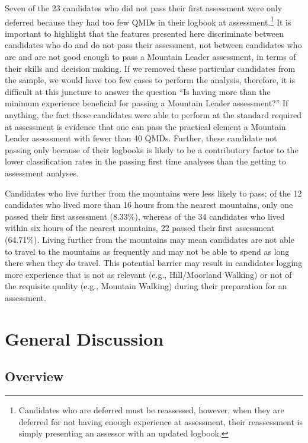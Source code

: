 \documentclass[
  12pt,
  a4paper,
]{book}
\begin{document}
Seven of the 23 candidates who did not pass their first assessment were only deferred because they had too few QMDs in their logbook at assessment.\footnote{Candidates who are deferred must be reassessed, however, when they are deferred for not having enough experience at assessment, their reassessment is simply presenting an assessor with an updated logbook.} It is important to highlight that the features presented here discriminate between candidates who do and do not pass their assessment, not between candidates who are and are not good enough to pass a Mountain Leader assessment, in terms of their skills and decision making. If we removed these particular candidates from the sample, we would have too few cases to perform the analysis, therefore, it is difficult at this juncture to answer the question ``Is having more than the minimum experience beneficial for passing a Mountain Leader assessment?'' If anything, the fact these candidates were able to perform at the standard required at assessment is evidence that one can pass the practical element a Mountain Leader assessment with fewer than 40 QMDs. Further, these candidate not passing only because of their logbooks is likely to be a contributory factor to the lower classification rates in the passing first time analyses than the getting to assessment analyses.

Candidates who live further from the mountains were less likely to pass; of the 12 candidates who lived more than 16 hours from the nearest mountains, only one passed their first assessment (8.33\%), whereas of the 34 candidates who lived within six hours of the nearest mountains, 22 passed their first assessment (64.71\%). Living further from the mountains may mean candidates are not able to travel to the mountains as frequently and may not be able to spend as long there when they do travel. This potential barrier may result in candidates logging more experience that is not as relevant (e.g., Hill/Moorland Walking) or not of the requisite quality (e.g., Mountain Walking) during their preparation for an assessment.

\hypertarget{pra-gen-discussion}{%
\section{General Discussion}\label{pra-gen-discussion}}

\hypertarget{overview}{%
\subsection{Overview}\label{overview}}
\end{document}
